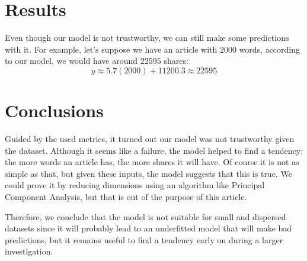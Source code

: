 \documentclass[10pt]{article}
\begin{document}
\section{Results}
Even though our model is not trustworthy, we can still make some predictions with it. For example, let's suppose we have an article with 2000 words, according to our model, we would have around 22595 shares:
\begin{equation*}
  y \approx 5.7(2000) + 11200.3 \approx 22595
\end{equation*}

\section{Conclusions}
Guided by the used metrics, it turned out our model was not trustworthy given the dataset. Although it seems like a failure, the model helped to find a tendency: the more words an article has, the more shares it will have. Of course it is not as simple as that, but given these inputs, the model suggests that this is true. We could prove it by reducing dimensions using an algorithm like Principal Component Analysis, but that is out of the purpose of this article. \par
Therefore, we conclude that the model is not suitable for small and dispersed datasets since it will probably lead to an underfitted model that will make bad predictions, but it remains useful to find a tendency early on during a larger investigation.



\end{document}
